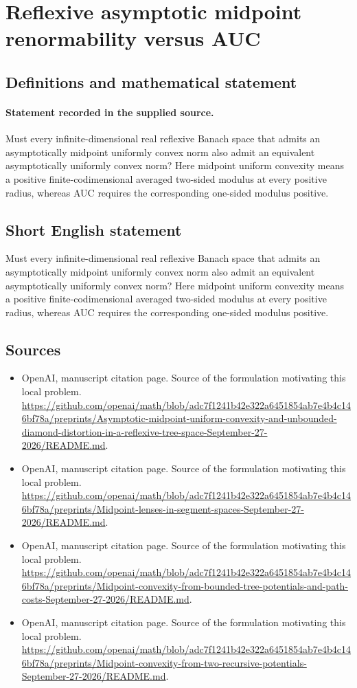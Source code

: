 \documentclass[11pt]{article}
\begin{document}
\section*{Reflexive asymptotic midpoint renormability versus AUC}\label{statement}
\subsection{Definitions and mathematical statement}
\paragraph{Statement recorded in the supplied source.}
Must every infinite-dimensional real reflexive Banach space that admits an asymptotically midpoint uniformly convex norm also admit an equivalent asymptotically uniformly convex norm? Here midpoint uniform convexity means a positive finite-codimensional averaged two-sided modulus at every positive radius, whereas AUC requires the corresponding one-sided modulus positive.
\subsection{Short English statement}
Must every infinite-dimensional real reflexive Banach space that admits an asymptotically midpoint uniformly convex norm also admit an equivalent asymptotically uniformly convex norm? Here midpoint uniform convexity means a positive finite-codimensional averaged two-sided modulus at every positive radius, whereas AUC requires the corresponding one-sided modulus positive.
\subsection{Sources}
\begin{itemize}
\item[S1] OpenAI, manuscript citation page. Source of the formulation motivating this local problem.
\url{https://github.com/openai/math/blob/adc7f1241b42e322a6451854ab7e4b4c146bf78a/preprints/Asymptotic-midpoint-uniform-convexity-and-unbounded-diamond-distortion-in-a-reflexive-tree-space-September-27-2026/README.md}.
\item[S2] OpenAI, manuscript citation page. Source of the formulation motivating this local problem.
\url{https://github.com/openai/math/blob/adc7f1241b42e322a6451854ab7e4b4c146bf78a/preprints/Midpoint-lenses-in-segment-spaces-September-27-2026/README.md}.
\item[S3] OpenAI, manuscript citation page. Source of the formulation motivating this local problem.
\url{https://github.com/openai/math/blob/adc7f1241b42e322a6451854ab7e4b4c146bf78a/preprints/Midpoint-convexity-from-bounded-tree-potentials-and-path-costs-September-27-2026/README.md}.
\item[S4] OpenAI, manuscript citation page. Source of the formulation motivating this local problem.
\url{https://github.com/openai/math/blob/adc7f1241b42e322a6451854ab7e4b4c146bf78a/preprints/Midpoint-convexity-from-two-recursive-potentials-September-27-2026/README.md}.
\end{itemize}
\end{document}
